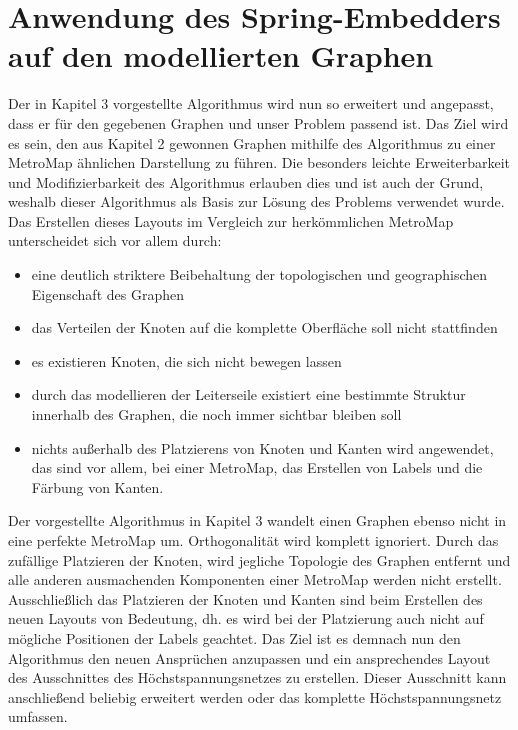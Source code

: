 
\chapter{Anwendung des Spring-Embedders auf den modellierten Graphen}
\label{Kapitel 4}
%

Der in Kapitel 3 vorgestellte Algorithmus wird nun so erweitert und angepasst, dass er für den gegebenen Graphen und unser Problem passend ist. Das Ziel wird es sein, den aus Kapitel 2 gewonnen Graphen mithilfe des Algorithmus zu einer MetroMap ähnlichen Darstellung zu führen. Die besonders leichte Erweiterbarkeit und Modifizierbarkeit des Algorithmus erlauben dies und ist auch der Grund, weshalb dieser Algorithmus als Basis zur Lösung des Problems verwendet wurde. \\

Das Erstellen dieses Layouts im Vergleich zur herkömmlichen MetroMap unterscheidet sich vor allem durch:

\begin{itemize}
	\item eine deutlich striktere Beibehaltung der topologischen und geographischen Eigenschaft des Graphen
	\item das Verteilen der Knoten auf die komplette Oberfläche soll nicht stattfinden
	\item es existieren Knoten, die sich nicht bewegen lassen
	\item durch das modellieren der Leiterseile existiert eine bestimmte Struktur innerhalb des Graphen, die noch immer sichtbar bleiben soll
	\item nichts außerhalb des Platzierens von Knoten und Kanten wird angewendet, das sind vor allem, bei einer MetroMap, das Erstellen von Labels und die Färbung von Kanten.
\end{itemize} 

Der vorgestellte Algorithmus in Kapitel 3 wandelt einen Graphen ebenso nicht in eine perfekte MetroMap um. Orthogonalität wird komplett ignoriert. Durch das zufällige Platzieren der Knoten, wird jegliche Topologie des Graphen entfernt und alle anderen ausmachenden Komponenten einer MetroMap werden nicht erstellt. Ausschließlich das Platzieren der Knoten und Kanten sind beim Erstellen des neuen Layouts von Bedeutung, dh. es wird bei der Platzierung auch nicht auf mögliche Positionen der Labels geachtet. Das Ziel ist es demnach nun den Algorithmus den neuen Ansprüchen anzupassen und ein ansprechendes Layout des Ausschnittes des Höchstspannungsnetzes zu erstellen. Dieser Ausschnitt  kann anschließend beliebig erweitert werden oder das komplette Höchstspannungsnetz umfassen.  


